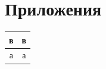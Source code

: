 \documentclass[12pt]{article}
\begin{document}
{		\newpage
			
			  
		
		\newpage
		
		\section{Приложения}
		\begin{tabular}{|c|c|}
			\hline 
			в & в \\ 
			\hline 
			а & а \\ 
			\hline 
		\end{tabular} 
	}
	
\end{document}
